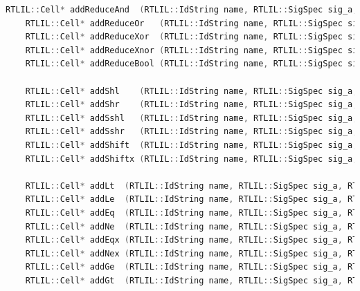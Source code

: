 \documentclass[11pt]{report}
\begin{document}
\begin{lstlisting}[language=C++]
	RTLIL::Cell* addReduceAnd  (RTLIL::IdString name, RTLIL::SigSpec sig_a, RTLIL::SigSpec sig_y, bool is_signed = false, const std::string &src = "");
	RTLIL::Cell* addReduceOr   (RTLIL::IdString name, RTLIL::SigSpec sig_a, RTLIL::SigSpec sig_y, bool is_signed = false, const std::string &src = "");
	RTLIL::Cell* addReduceXor  (RTLIL::IdString name, RTLIL::SigSpec sig_a, RTLIL::SigSpec sig_y, bool is_signed = false, const std::string &src = "");
	RTLIL::Cell* addReduceXnor (RTLIL::IdString name, RTLIL::SigSpec sig_a, RTLIL::SigSpec sig_y, bool is_signed = false, const std::string &src = "");
	RTLIL::Cell* addReduceBool (RTLIL::IdString name, RTLIL::SigSpec sig_a, RTLIL::SigSpec sig_y, bool is_signed = false, const std::string &src = "");

	RTLIL::Cell* addShl    (RTLIL::IdString name, RTLIL::SigSpec sig_a, RTLIL::SigSpec sig_b, RTLIL::SigSpec sig_y, bool is_signed = false, const std::string &src = "");
	RTLIL::Cell* addShr    (RTLIL::IdString name, RTLIL::SigSpec sig_a, RTLIL::SigSpec sig_b, RTLIL::SigSpec sig_y, bool is_signed = false, const std::string &src = "");
	RTLIL::Cell* addSshl   (RTLIL::IdString name, RTLIL::SigSpec sig_a, RTLIL::SigSpec sig_b, RTLIL::SigSpec sig_y, bool is_signed = false, const std::string &src = "");
	RTLIL::Cell* addSshr   (RTLIL::IdString name, RTLIL::SigSpec sig_a, RTLIL::SigSpec sig_b, RTLIL::SigSpec sig_y, bool is_signed = false, const std::string &src = "");
	RTLIL::Cell* addShift  (RTLIL::IdString name, RTLIL::SigSpec sig_a, RTLIL::SigSpec sig_b, RTLIL::SigSpec sig_y, bool is_signed = false, const std::string &src = "");
	RTLIL::Cell* addShiftx (RTLIL::IdString name, RTLIL::SigSpec sig_a, RTLIL::SigSpec sig_b, RTLIL::SigSpec sig_y, bool is_signed = false, const std::string &src = "");

	RTLIL::Cell* addLt  (RTLIL::IdString name, RTLIL::SigSpec sig_a, RTLIL::SigSpec sig_b, RTLIL::SigSpec sig_y, bool is_signed = false, const std::string &src = "");
	RTLIL::Cell* addLe  (RTLIL::IdString name, RTLIL::SigSpec sig_a, RTLIL::SigSpec sig_b, RTLIL::SigSpec sig_y, bool is_signed = false, const std::string &src = "");
	RTLIL::Cell* addEq  (RTLIL::IdString name, RTLIL::SigSpec sig_a, RTLIL::SigSpec sig_b, RTLIL::SigSpec sig_y, bool is_signed = false, const std::string &src = "");
	RTLIL::Cell* addNe  (RTLIL::IdString name, RTLIL::SigSpec sig_a, RTLIL::SigSpec sig_b, RTLIL::SigSpec sig_y, bool is_signed = false, const std::string &src = "");
	RTLIL::Cell* addEqx (RTLIL::IdString name, RTLIL::SigSpec sig_a, RTLIL::SigSpec sig_b, RTLIL::SigSpec sig_y, bool is_signed = false, const std::string &src = "");
	RTLIL::Cell* addNex (RTLIL::IdString name, RTLIL::SigSpec sig_a, RTLIL::SigSpec sig_b, RTLIL::SigSpec sig_y, bool is_signed = false, const std::string &src = "");
	RTLIL::Cell* addGe  (RTLIL::IdString name, RTLIL::SigSpec sig_a, RTLIL::SigSpec sig_b, RTLIL::SigSpec sig_y, bool is_signed = false, const std::string &src = "");
	RTLIL::Cell* addGt  (RTLIL::IdString name, RTLIL::SigSpec sig_a, RTLIL::SigSpec sig_b, RTLIL::SigSpec sig_y, bool is_signed = false, const std::string &src = "");


\end{lstlisting}
\end{document}
